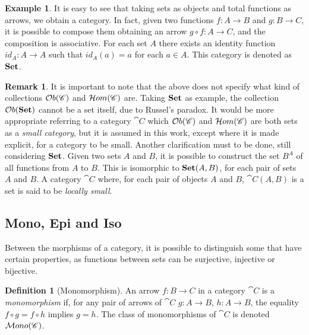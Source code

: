 \documentclass[a4paper, twoside,openright]{report}
\theoremstyle{plain}
\theoremstyle{definition}
\newtheorem{definition}[theorem]{Definition}
\newtheorem{example}[theorem]{Example}
\newtheorem{remark}[theorem]{Remark}
\begin{document}
\begin{example}
    It is easy to see that taking sets as objects and total functions as arrows, we obtain a category. In fact, given two functions $f: A \rightarrow B$ and $g: B \rightarrow C$, it is possible to compose them obtaining an arrow $g \circ f : A \rightarrow C$, and the composition is associative. For each set $A$ there exists an identity function $id_A: A \rightarrow A$ such that $id_A(a) = a$ for each $a\in A$.
    This category is denoted as $\mathbf{Set}$.
\end{example}

\begin{remark}\label{rem:small_cats}
    It is important to note that the  above does not specify what kind of collections
    $\mathcal{O}b(\mathscr{C})$ and $\mathcal{H}om(\mathscr{C})$ are.
    Taking $\mathbf{Set}$ as example, the collection $\mathcal{O}b(\mathbf{Set})$ cannot be a set itself, due to Russel's paradox. It would be more appropriate referring to a category $\cat{C}$ which $\mathcal{O}b(\mathscr{C})$ and $\mathcal{H}om(\mathscr{C})$ are both sets as a \emph{small category}, but it is assumed in this work, except where it is made explicit, for a category to be small.
    Another clarification must to be done, still considering $\mathbf{Set}$. Given two sets $A$ and $B$, it is possible to construct the set $B^A$ of all functions from $A$ to $B$. This is isomorphic to $\mathbf{Set}(A, B)$, for each pair of sets $A$ and $B$.
    A category $\cat C$ where, for each pair of objects $A$ and $B$, $\cat C (A, B)$ is a set is said to be \emph{locally small}.
\end{remark}

\subsection{Mono, Epi and Iso}\label{ssect:Mono_epi_iso}

Between the morphisms of a category, it is possible to distinguish some that have certain properties, as functions between sets can be surjective, injective or bijective.

\begin{definition}[Monomorphism]\label{def:mono}
    An arrow $f:B\rightarrow C$ in a category $\cat{C}$ is a \emph{monomorphism} if, for any pair of arrows of $\cat{C}$ $g:A \rightarrow B$, $h: A \rightarrow B$, the equality $f \circ g = f \circ h$ implies $g = h$. The class of monomorphisms of $\cat C$ is denoted $\mathcal{M}ono(\mathscr{C})$.
\end{definition}
\end{document}
